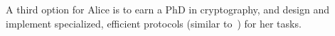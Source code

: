 A third option for Alice is to earn a PhD in cryptography, and design
and implement specialized, efficient \mpc protocols (similar
to~\cite{shafindss,wu,minionn,valeriaMatrix}) for her tasks.










